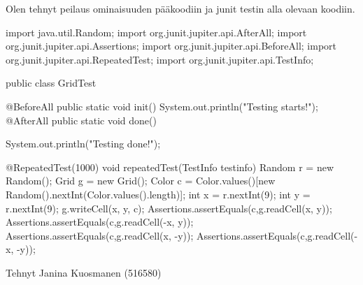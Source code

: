 \label{c & d}
Olen tehnyt peilaus ominaisuuden pääkoodiin ja junit testin alla olevaan koodiin. 


\begin{javacode}
import java.util.Random;
import org.junit.jupiter.api.AfterAll;
import org.junit.jupiter.api.Assertions;
import org.junit.jupiter.api.BeforeAll;
import org.junit.jupiter.api.RepeatedTest; 
import org.junit.jupiter.api.TestInfo;

public class GridTest {

	@BeforeAll
	public static void init() {
		System.out.println("Testing starts!");
	}
	@AfterAll
	public static void done() {
		System.out.println("Testing done!");

	}
	@RepeatedTest(1000)
	void repeatedTest(TestInfo testinfo){
		Random r = new Random();
		Grid g = new Grid();
		Color c = Color.values()[new Random().nextInt(Color.values().length)];
		int x = r.nextInt(9);
		int y = r.nextInt(9);
		g.writeCell(x, y, c);
		Assertions.assertEquals(c,g.readCell(x, y));
		Assertions.assertEquals(c,g.readCell(-x, y));
		Assertions.assertEquals(c,g.readCell(x, -y));
		Assertions.assertEquals(c,g.readCell(-x, -y));
	}
}
\end{javacode}


Tehnyt Janina Kuosmanen (516580)
